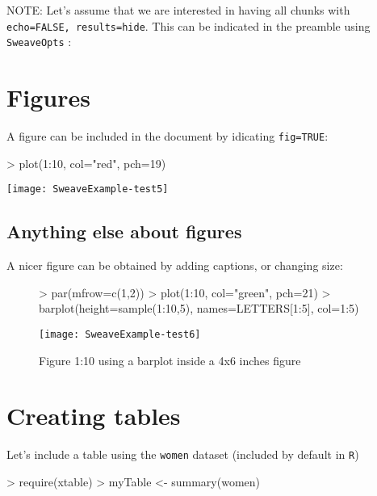 \documentclass[11pt]{article}
\begin{document}
NOTE: Let's assume that we are interested in having all chunks with {\tt echo=FALSE, 
results=hide}. This can be indicated in the preamble using {\tt SweaveOpts} :



\section{Figures}
A figure can be included in the document by idicating {\tt fig=TRUE}:

\begin{Schunk}
\begin{Sinput}
> plot(1:10, col="red", pch=19)
\end{Sinput}
\end{Schunk}
\texttt{[image: SweaveExample-test5]}

\newpage

\subsection{Anything else about figures}

A nicer figure can be obtained by adding captions, or changing size:

\begin{figure}[h]
\begin{Schunk}
\begin{Sinput}
> par(mfrow=c(1,2))
> plot(1:10, col="green", pch=21)
> barplot(height=sample(1:10,5), names=LETTERS[1:5], col=1:5)
\end{Sinput}
\end{Schunk}
\texttt{[image: SweaveExample-test6]}
\caption{Figure 1:10 using a barplot inside a 4x6 inches figure}
\end{figure}

\newpage

\section{Creating tables}

\noindent Let's include a table using the {\tt women} dataset (included by default in {\tt R})

\begin{Schunk}
\begin{Sinput}
> require(xtable)
> myTable <- summary(women)
\end{Sinput}
\end{Schunk}
\end{document}
